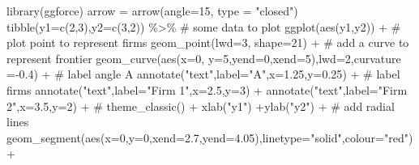 \documentclass[
  letterpaper,
  DIV=11,
  numbers=noendperiod]{scrartcl}
\newenvironment{Shaded}{\begin{snugshade}}{\end{snugshade}}
\newcommand{\AttributeTok}[1]{\textcolor[rgb]{0.40,0.46,0.14}{#1}}
\newcommand{\CommentTok}[1]{\textcolor[rgb]{0.37,0.37,0.37}{#1}}
\newcommand{\DecValTok}[1]{\textcolor[rgb]{0.68,0.00,0.00}{#1}}
\newcommand{\FloatTok}[1]{\textcolor[rgb]{0.68,0.00,0.00}{#1}}
\newcommand{\FunctionTok}[1]{\textcolor[rgb]{0.28,0.35,0.67}{#1}}
\newcommand{\NormalTok}[1]{\textcolor[rgb]{0.00,0.46,0.62}{#1}}
\newcommand{\OtherTok}[1]{\textcolor[rgb]{0.00,0.46,0.62}{#1}}
\newcommand{\SpecialCharTok}[1]{\textcolor[rgb]{0.37,0.37,0.37}{#1}}
\newcommand{\StringTok}[1]{\textcolor[rgb]{0.13,0.47,0.30}{#1}}
\begin{document}
\begin{Shaded}
\begin{Highlighting}[]
\FunctionTok{library}\NormalTok{(ggforce)}
\NormalTok{arrow }\OtherTok{=} \FunctionTok{arrow}\NormalTok{(}\AttributeTok{angle=}\DecValTok{15}\NormalTok{, }\AttributeTok{type =} \StringTok{"closed"}\NormalTok{)}
\FunctionTok{tibble}\NormalTok{(}\AttributeTok{y1=}\FunctionTok{c}\NormalTok{(}\DecValTok{2}\NormalTok{,}\DecValTok{3}\NormalTok{),}\AttributeTok{y2=}\FunctionTok{c}\NormalTok{(}\DecValTok{3}\NormalTok{,}\DecValTok{2}\NormalTok{)) }\SpecialCharTok{\%\textgreater{}\%} \CommentTok{\# some data to plot}
  \FunctionTok{ggplot}\NormalTok{(}\FunctionTok{aes}\NormalTok{(y1,y2)) }\SpecialCharTok{+}
  \CommentTok{\# plot point to represent firms}
  \FunctionTok{geom\_point}\NormalTok{(}\AttributeTok{lwd=}\DecValTok{3}\NormalTok{, }\AttributeTok{shape=}\DecValTok{21}\NormalTok{) }\SpecialCharTok{+} 
  \CommentTok{\# add a curve to represent frontier}
  \FunctionTok{geom\_curve}\NormalTok{(}\FunctionTok{aes}\NormalTok{(}\AttributeTok{x=}\DecValTok{0}\NormalTok{, }\AttributeTok{y=}\DecValTok{5}\NormalTok{,}\AttributeTok{yend=}\DecValTok{0}\NormalTok{,}\AttributeTok{xend=}\DecValTok{5}\NormalTok{),}\AttributeTok{lwd=}\DecValTok{2}\NormalTok{,}\AttributeTok{curvature =}\SpecialCharTok{{-}}\FloatTok{0.4}\NormalTok{) }\SpecialCharTok{+} 
    \CommentTok{\# label angle A}
  \FunctionTok{annotate}\NormalTok{(}\StringTok{"text"}\NormalTok{,}\AttributeTok{label=}\StringTok{"A"}\NormalTok{,}\AttributeTok{x=}\FloatTok{1.25}\NormalTok{,}\AttributeTok{y=}\FloatTok{0.25}\NormalTok{) }\SpecialCharTok{+}
  \CommentTok{\# label firms}
  \FunctionTok{annotate}\NormalTok{(}\StringTok{"text"}\NormalTok{,}\AttributeTok{label=}\StringTok{"Firm 1"}\NormalTok{,}\AttributeTok{x=}\FloatTok{2.5}\NormalTok{,}\AttributeTok{y=}\DecValTok{3}\NormalTok{) }\SpecialCharTok{+}
  \FunctionTok{annotate}\NormalTok{(}\StringTok{"text"}\NormalTok{,}\AttributeTok{label=}\StringTok{"Firm 2"}\NormalTok{,}\AttributeTok{x=}\FloatTok{3.5}\NormalTok{,}\AttributeTok{y=}\DecValTok{2}\NormalTok{) }\SpecialCharTok{+}
  \CommentTok{\# theme\_classic() +}
  \FunctionTok{xlab}\NormalTok{(}\StringTok{"y1"}\NormalTok{) }\SpecialCharTok{+}\FunctionTok{ylab}\NormalTok{(}\StringTok{"y2"}\NormalTok{) }\SpecialCharTok{+} 
  \CommentTok{\# add radial lines}
  \FunctionTok{geom\_segment}\NormalTok{(}\FunctionTok{aes}\NormalTok{(}\AttributeTok{x=}\DecValTok{0}\NormalTok{,}\AttributeTok{y=}\DecValTok{0}\NormalTok{,}\AttributeTok{xend=}\FloatTok{2.7}\NormalTok{,}\AttributeTok{yend=}\FloatTok{4.05}\NormalTok{),}\AttributeTok{linetype=}\StringTok{"solid"}\NormalTok{,}\AttributeTok{colour=}\StringTok{"red"}\NormalTok{) }\SpecialCharTok{+} 

\end{Highlighting}
\end{Shaded}
\end{document}
